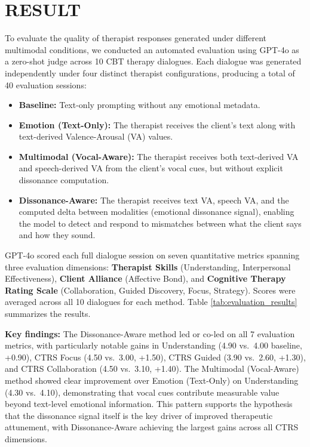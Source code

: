 \setlength{\footskip}{8mm}

\chapter{RESULT}

To evaluate the quality of therapist responses generated under different multimodal conditions, we conducted an automated evaluation using GPT-4o as a zero-shot judge across 10 CBT therapy dialogues. Each dialogue was generated independently under four distinct therapist configurations, producing a total of 40 evaluation sessions:

\begin{itemize}
    \item \textbf{Baseline:} Text-only prompting without any emotional metadata.
    \item \textbf{Emotion (Text-Only):} The therapist receives the client's text along with text-derived Valence-Arousal (VA) values.
    \item \textbf{Multimodal (Vocal-Aware):} The therapist receives both text-derived VA and speech-derived VA from the client's vocal cues, but without explicit dissonance computation.
    \item \textbf{Dissonance-Aware:} The therapist receives text VA, speech VA, and the computed delta between modalities (emotional dissonance signal), enabling the model to detect and respond to mismatches between what the client says and how they sound.
\end{itemize}

GPT-4o scored each full dialogue session on seven quantitative metrics spanning three evaluation dimensions: \textbf{Therapist Skills} (Understanding, Interpersonal Effectiveness), \textbf{Client Alliance} (Affective Bond), and \textbf{Cognitive Therapy Rating Scale} (Collaboration, Guided Discovery, Focus, Strategy). Scores were averaged across all 10 dialogues for each method. Table \ref{tab:evaluation_results} summarizes the results.

\textbf{Key findings:} The Dissonance-Aware method led or co-led on all 7 evaluation metrics, with particularly notable gains in Understanding (4.90 vs.\ 4.00 baseline, +0.90), CTRS Focus (4.50 vs.\ 3.00, +1.50), CTRS Guided (3.90 vs.\ 2.60, +1.30), and CTRS Collaboration (4.50 vs.\ 3.10, +1.40). The Multimodal (Vocal-Aware) method showed clear improvement over Emotion (Text-Only) on Understanding (4.30 vs.\ 4.10), demonstrating that vocal cues contribute measurable value beyond text-level emotional information. This pattern supports the hypothesis that the dissonance signal itself is the key driver of improved therapeutic attunement, with Dissonance-Aware achieving the largest gains across all CTRS dimensions.

